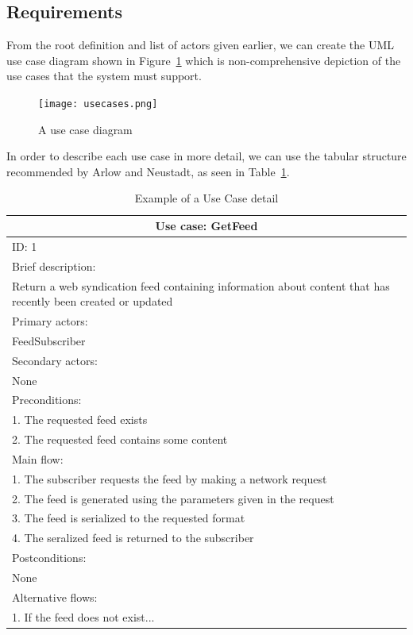 \documentclass{article}
\begin{document}
\subsection{Requirements}

From the root definition and list of actors given earlier, we can create the UML use case diagram shown in Figure~\ref{use-cases} which is non-comprehensive depiction of the use cases that the system must support.

\begin{figure}
  \texttt{[image: usecases.png]}
  \caption{A use case diagram}
  \label{use-cases}
\end{figure}

In order to describe each use case in more detail, we can use the tabular structure recommended by Arlow and Neustadt, as seen in Table~\ref{use-case-detail}.

\begin{table}[]
\begin{center}
\begin{tabular}{ | p{\textwidth} |}
\hline
\multicolumn{1}{|c|}{Use case: GetFeed} \\
\hline
ID: 1 \\
\hline
Brief description: \\
Return a web syndication feed containing information about content that has recently been created or updated \\
\hline
Primary actors: \\
FeedSubscriber \\
\hline
Secondary actors: \\
None \\
\hline
Preconditions: \\
1. The requested feed exists \\
2. The requested feed contains some content \\
\hline
Main flow: \\
1. The subscriber requests the feed by making a network request \\
2. The feed is generated using the parameters given in the request \\
3. The feed is serialized to the requested format \\
4. The seralized feed is returned to the subscriber \\
\hline
Postconditions: \\
None \\
\hline
Alternative flows: \\
1. If the feed does not exist... \\
\hline
\end{tabular}
\end{center}
\caption{Example of a Use Case detail}
\label{use-case-detail}
\end{table}
\end{document}
